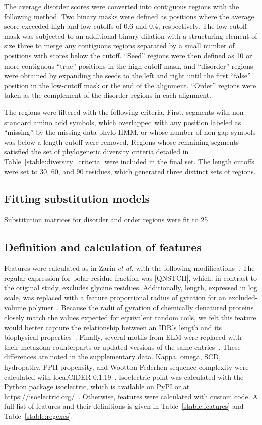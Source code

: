 The average disorder scores were converted into contiguous regions with the following method. Two binary masks were defined as positions where the average score exceeded high and low cutoffs of 0.6 and 0.4, respectively. The low-cutoff mask was subjected to an additional binary dilation with a structuring element of size three to merge any contiguous regions separated by a small number of positions with scores below the cutoff. ``Seed'' regions were then defined as 10 or more contiguous ``true'' positions in the high-cutoff mask, and ``disorder'' regions were obtained by expanding the seeds to the left and right until the first ``false'' position in the low-cutoff mask or the end of the alignment. ``Order'' regions were taken as the complement of the disorder regions in each alignment.

The regions were filtered with the following criteria. First, segments with non-standard amino acid symbols, which overlapped with any position labeled as ``missing'' by the missing data phylo-HMM, or whose number of non-gap symbols was below a length cutoff were removed. Regions whose remaining segments satisfied the set of phylogenetic diversity criteria detailed in Table~\ref{stable:diversity_criteria} were included in the final set. The length cutoffs were set to 30, 60, and 90 residues, which generated three distinct sets of regions.

\subsection{Fitting substitution models}
Substitution matrices for disorder and order regions were fit to 25

\subsection{Definition and calculation of features}
Features were calculated as in Zarin \textit{et al.} with the following modifications~\cite{Zarin2019}. The regular expression for polar residue fraction was [QNSTCH], which, in contrast to the original study, excludes glycine residues. Additionally, length, expressed in log scale, was replaced with a feature proportional radius of gyration for an excluded-volume polymer~\cite{Flory1949}. Because the radii of gyration of chemically denatured proteins closely match the values expected for equivalent random coils, we felt this feature would better capture the relationship between an IDR's length and its biophysical properties~\cite{Kohn2004}. Finally, several motifs from ELM were replaced with their metazoan counterparts or updated versions of the same entries~\cite{Kumar2021}. These differences are noted in the supplementary data. Kappa, omega, SCD, hydropathy, PPII propensity, and Wootton-Federhen sequence complexity were calculated with localCIDER 0.1.19~\cite{Holehouse2017}. Isoelectric point was calculated with the Python package isoelectric, which is available on PyPI or at \url{https://isoelectric.org/}~\cite{Kozlowski2016}. Otherwise, features were calculated with custom code. A full list of features and their definitions is given in Table~\ref{stable:features} and Table~\ref{stable:regexes}.

